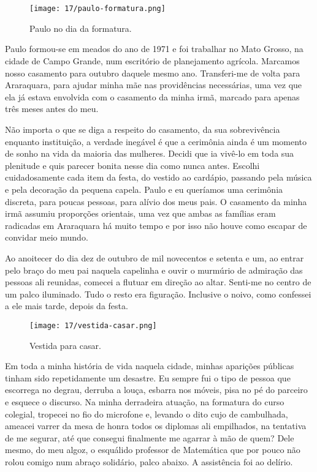 \chapter{}

\begin{figure}
\centering
\texttt{[image: 17/paulo-formatura.png]}
\caption{Paulo no dia da formatura.}
\end{figure}

Paulo formou-se em meados do ano de 1971 e foi trabalhar no Mato Grosso, na cidade de Campo Grande, num escritório de planejamento agrícola.
Marcamos nosso casamento para outubro daquele mesmo ano.
Transferi-me de volta para Araraquara, para ajudar minha mãe nas providências necessárias, uma vez que ela já estava envolvida com o casamento da minha irmã, marcado para apenas três meses antes do meu.


Não importa o que se diga a respeito do casamento, da sua sobrevivência enquanto instituição, a verdade inegável é que a cerimônia ainda é um momento de sonho na vida da maioria das mulheres.
Decidi que ia vivê-lo em toda sua plenitude e quis parecer bonita nesse dia como nunca antes.
Escolhi cuidadosamente cada item da festa, do vestido ao cardápio, passando pela música e pela decoração da pequena capela.
Paulo e eu queríamos uma cerimônia discreta, para poucas pessoas, para alívio dos meus pais.
O casamento da minha irmã assumiu proporções orientais, uma vez que ambas as famílias eram radicadas em Araraquara há muito tempo e por isso não houve como escapar de convidar meio mundo.

Ao anoitecer do dia dez de outubro de mil novecentos e setenta e um, ao entrar pelo braço do meu pai naquela capelinha e ouvir o murmúrio de admiração das pessoas ali reunidas, comecei a flutuar em direção ao altar.
Senti-me no centro de um palco iluminado.
Tudo o resto era figuração.
Inclusive o noivo, como confessei a ele mais tarde, depois da festa.


\begin{figure}[H]
\centering
\texttt{[image: 17/vestida-casar.png]}
\caption{Vestida para casar.}
\end{figure}

Em toda a minha história de vida naquela cidade, minhas aparições públicas tinham sido repetidamente um desastre.
Eu sempre fui o tipo de pessoa que escorrega no degrau, derruba a louça, esbarra nos móveis, pisa no pé do parceiro e esquece o discurso.
Na minha derradeira atuação, na formatura do curso colegial, tropecei no fio do microfone e, levando o dito cujo de cambulhada, ameacei varrer da mesa de honra todos os diplomas ali empilhados, na tentativa de me segurar, até que consegui finalmente me agarrar à mão de quem?  Dele mesmo, do meu algoz, o esquálido professor de Matemática que por pouco não rolou comigo num abraço solidário, palco abaixo.
A assistência foi ao delírio.
 

